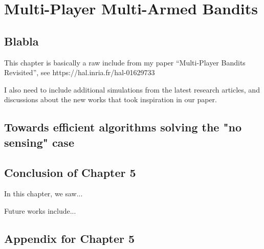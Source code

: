 
\chapter{Multi-Player Multi-Armed Bandits}
\label{chapter:5}
\minitoc
\newpage
\graphicspath{{2-Chapters/5-Chapter/Images/}}

\section{Blabla}
\label{sec:blabla}

This chapter is basically a raw include from my paper ``Multi-Player Bandits Revisited'', see https://hal.inria.fr/hal-01629733

I also need to include additional simulations from the latest research articles, and discussions about the new works that took inspiration in our paper.


\section{Towards efficient algorithms solving the "no sensing" case}
\label{sec:5:XXX}



\section{Conclusion of Chapter 5}
\label{sec:5:conclusion}

In this chapter, we saw...

Future works include...




\section{Appendix for Chapter 5}
\label{sec:5:appendix}

